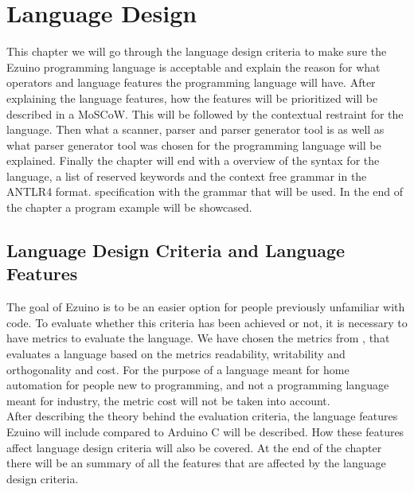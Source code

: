 \chapter{Language Design}\label{ch:langspec}

This chapter we will go through the language design criteria to make sure the Ezuino programming language is acceptable and explain the reason for what operators and language features the programming language will have. After explaining the language features, how the features will be prioritized will be described in a MoSCoW. 
This will be followed by the contextual restraint for the language. Then what a scanner, parser and parser generator tool is as well as what parser generator tool was chosen for the programming language will be explained. Finally the chapter will end with a overview of the syntax for the language, a list of reserved keywords and the context free grammar in the ANTLR4 format.  specification with the grammar that will be used. In the end of the chapter a program example will be showcased. 

\section{Language Design Criteria and Language Features}
The goal of Ezuino is to be an easier option for people previously unfamiliar with code. To evaluate whether this criteria has been achieved or not, it is necessary to have metrics to evaluate the language. We have chosen the metrics from \cite{conceptsOfProgrammingLanguages}, that evaluates a language based on the metrics readability, writability and orthogonality and cost. For the purpose of a language meant for home automation for people new to programming, and not a programming language meant for industry, the metric cost will not be taken into account. \\
After describing the theory behind the evaluation criteria, the language features Ezuino will include compared to Arduino C will be described. How these features affect language design criteria will also be covered. At the end of the chapter there will be an summary of all the features that are affected by the language design criteria.